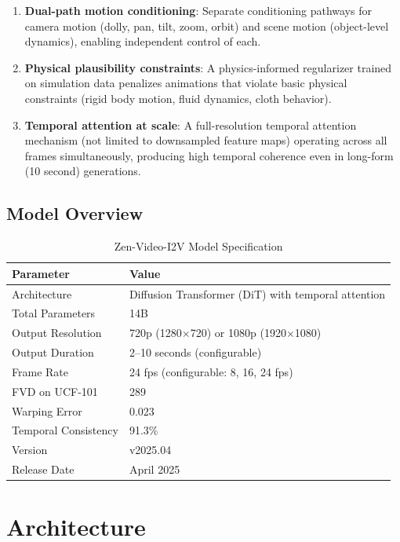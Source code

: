\documentclass[11pt,a4paper]{article}
\begin{document}
\begin{enumerate}
  \item \textbf{Dual-path motion conditioning}: Separate conditioning pathways for camera motion (dolly, pan, tilt, zoom, orbit) and scene motion (object-level dynamics), enabling independent control of each.
  \item \textbf{Physical plausibility constraints}: A physics-informed regularizer trained on simulation data penalizes animations that violate basic physical constraints (rigid body motion, fluid dynamics, cloth behavior).
  \item \textbf{Temporal attention at scale}: A full-resolution temporal attention mechanism (not limited to downsampled feature maps) operating across all frames simultaneously, producing high temporal coherence even in long-form (10 second) generations.
\end{enumerate}

\subsection{Model Overview}

\begin{table}[H]
\centering
\caption{Zen-Video-I2V Model Specification}
\begin{tabular}{ll}
\toprule
\textbf{Parameter} & \textbf{Value} \\
\midrule
Architecture & Diffusion Transformer (DiT) with temporal attention \\
Total Parameters & 14B \\
Output Resolution & 720p (1280$\times$720) or 1080p (1920$\times$1080) \\
Output Duration & 2--10 seconds (configurable) \\
Frame Rate & 24 fps (configurable: 8, 16, 24 fps) \\
FVD on UCF-101 & 289 \\
Warping Error & 0.023 \\
Temporal Consistency & 91.3\% \\
Version & v2025.04 \\
Release Date & April 2025 \\
\bottomrule
\end{tabular}
\end{table}

\section{Architecture}
\end{document}
